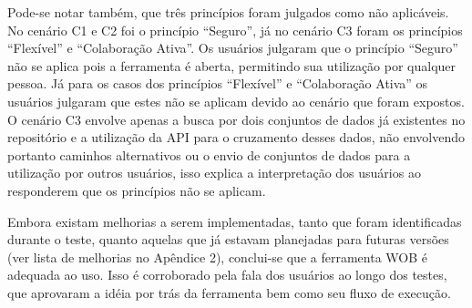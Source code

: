 Pode-se notar também, que três princípios foram julgados como não aplicáveis. No cenário 
C1 e C2 foi o princípio “Seguro”, já no cenário C3 foram os princípios “Flexível” e 
“Colaboração Ativa”. Os usuários julgaram que o princípio “Seguro” não se aplica pois a 
ferramenta é aberta, permitindo sua utilização por qualquer pessoa. Já para os casos dos 
princípios “Flexível” e “Colaboração Ativa” os usuários julgaram que estes não se aplicam 
devido ao cenário que foram expostos. O cenário C3 envolve apenas a busca por dois 
conjuntos de dados já existentes no repositório e a utilização da API para o cruzamento 
desses dados, não envolvendo portanto caminhos alternativos ou o envio de conjuntos de 
dados para a utilização por outros usuários, isso explica a interpretação dos usuários 
ao responderem que os princípios não se aplicam.

Embora existam melhorias a serem implementadas, tanto que foram identificadas durante o 
teste, quanto aquelas que já estavam planejadas para futuras versões (ver lista de 
melhorias no Apêndice 2), conclui-se que a ferramenta WOB é adequada ao uso. Isso é 
corroborado pela fala dos usuários ao longo dos testes, que aprovaram a idéia por trás da 
ferramenta bem como seu fluxo de execução. 
